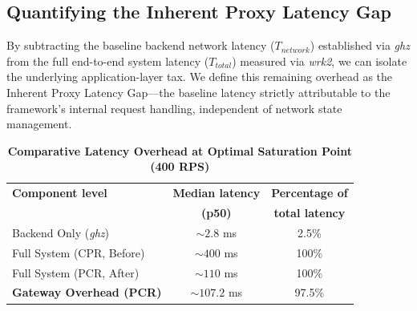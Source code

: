 \documentclass{ieeeaccess}
\begin{document}
\subsection{Quantifying the Inherent Proxy Latency Gap}
\label{sec5.4}

By subtracting the baseline backend network latency ($T_{network}$) established via \textit{ghz} from the full end-to-end system latency ($T_{total}$) measured via \textit{wrk2}, we can isolate the underlying application-layer tax. We define this remaining overhead as the Inherent Proxy Latency Gap---the baseline latency strictly attributable to the framework's internal request handling, independent of network state management.


\begin{table}[htbp]
\centering
\caption{\textbf{Comparative Latency Overhead at Optimal Saturation Point (400 RPS)}}
\label{table1}
\setlength{\tabcolsep}{3pt}
\begin{tabular}{lcc}
\hline
\textbf{Component level}& \textbf{Median latency}& \textbf{Percentage of}\\
& \textbf{(p50)} & \textbf{total latency}\\
\hline
Backend Only (\textit{ghz}) & $\sim 2.8$ ms & 2.5\% \\
Full System (CPR, Before) & $\sim 400$ ms & 100\% \\
Full System (PCR, After) & $\sim 110$ ms & 100\% \\
\hline
\textbf{Gateway Overhead (PCR)} & $\sim 107.2$ ms & 97.5\% \\ 
\hline
\end{tabular}
\end{table}
    
\end{document}
